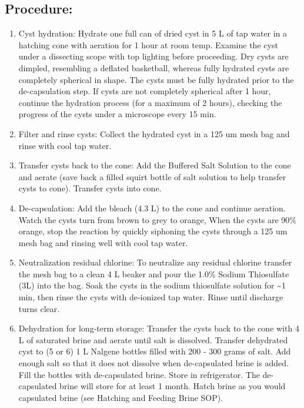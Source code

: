 \documentclass[
]{book}
\providecommand{\tightlist}{%
  \setlength{\itemsep}{0pt}\setlength{\parskip}{0pt}}
\begin{document}
\hypertarget{procedure-5}{%
\subsection{Procedure:}\label{procedure-5}}

\begin{enumerate}
\def\labelenumi{\arabic{enumi}.}
\tightlist
\item
  Cyst hydration: Hydrate one full can of dried cyst in 5 L of tap water in a hatching cone with aeration for 1 hour at room temp. Examine the cyst under a dissecting scope with top lighting before proceeding. Dry cysts are dimpled, resembling a deflated basketball, whereas fully hydrated cysts are completely spherical in shape. The cysts must be fully hydrated prior to the de-capsulation step. If cysts are not completely spherical after 1 hour, continue the hydration process (for a maximum of 2 hours), checking the progress of the cysts under a microscope every 15 min.
\item
  Filter and rinse cysts: Collect the hydrated cyst in a 125 um mesh bag and rinse with cool tap water.
\item
  Transfer cysts back to the cone: Add the Buffered Salt Solution to the cone and aerate (save back a filled squirt bottle of salt solution to help transfer cysts to cone). Transfer cysts into cone.
\item
  De-capsulation: Add the bleach (4.3 L) to the cone and continue aeration. Watch the cysts turn from brown to grey to orange, When the cysts are 90\% orange, stop the reaction by quickly siphoning the cysts through a 125 um mesh bag and rinsing well with cool tap water.
\item
  Neutralization residual chlorine: To neutralize any residual chlorine transfer the mesh bag to a clean 4 L beaker and pour the 1.0\% Sodium Thiosulfate (3L) into the bag. Soak the cysts in the sodium thiosulfate solution for \textasciitilde1 min, then rinse the cysts with de-ionized tap water. Rinse until discharge turns clear.
\item
  Dehydration for long-term storage: Transfer the cysts back to the cone with 4 L of saturated brine and aerate until salt is dissolved. Transfer dehydrated cyst to (5 or 6) 1 L Nalgene bottles filled with 200 - 300 grams of salt. Add enough salt so that it does not dissolve when de-capsulated brine is added. Fill the bottles with de-capsulated brine. Store in refrigerator. The de-capsulated brine will store for at least 1 month. Hatch brine as you would capsulated brine (see Hatching and Feeding Brine SOP).
\end{enumerate}
\end{document}
